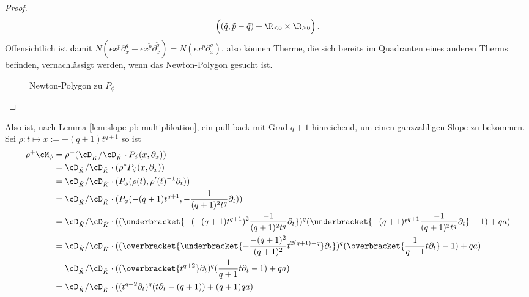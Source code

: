 \begin{proof}
\[\Big( (\tilde q,\tilde p-\tilde q) + \R_{\leq 0} \times \R_{\geq 0} \Big) \,.
\]
Offensichtlich ist damit $ N(\epsilon x^{p}\partial_x^{q}+\tilde\epsilon
x^{\tilde p}\partial_x^{\tilde q}) =N(\epsilon x^{p}\partial_x^{q}) $, also
können Therme, die sich bereits im Quadranten eines anderen Therms befinden,
vernachlässigt werden, wenn das Newton-Polygon gesucht ist.
\begin{figure}[htbp] %
\begin{center}
\end{center}
\caption{Newton-Polygon zu $P_{\phi}$}
\end{figure}
\end{proof}
Also ist, nach Lemma \ref{lem:slope-pb-multiplikation}, ein pull-back mit Grad
$q+1$ hinreichend, um einen ganzzahligen Slope zu bekommen.
Sei $\rho:t\mapsto x:=-(q+1) t^{q+1}$ so ist
\begin{align*}
\rho^+\cM_\phi &= \rho^+(\cD_{\hat K}/\cD_{\hat K}\cdot P_\phi(x,\partial_x))\\
  &=\cD_{\hat K}/\cD_{\hat K}\cdot(\rho^*P_\phi(x,\partial_x))\\
  &=\cD_{\hat K}/\cD_{\hat K}\cdot(P_\phi(\rho(t),\rho'(t)^{-1}\partial_t))\\
  &=\cD_{\hat K}/\cD_{\hat K}
    \cdot(P_\phi(-(q+1) t^{q+1},-\frac{1}{(q+1)^2t^q}\partial_t))\\
  &=\cD_{\hat K}/\cD_{\hat K} \cdot
    ((\underbracket{-(-(q+1) t^{q+1})^2\frac{-1}{(q+1)^2t^{q}}\partial_t})^{q}
    (\underbracket{-(q+1) t^{q+1}\frac{-1}{(q+1)^2t^{q}}\partial_t}-1)+qa)\\
  &=\cD_{\hat K}/\cD_{\hat K}
    \cdot((\overbracket{
      \underbracket{-\frac{-(q+1)^2}{(q+1)^2}t^{2(q+1)-q}}\partial_t})^{q}
    (\overbracket{\frac{1}{q+1}t\partial_t}-1)+qa)\\
  &=\cD_{\hat K}/\cD_{\hat K}
    \cdot((\overbracket{t^{q+2}}\partial_t)^{q}
    (\frac{1}{q+1}t\partial_t-1)+qa)\\
  &=\cD_{\hat K}/\cD_{\hat K}
    \cdot((t^{q+2}\partial_t)^{q}
    (t\partial_t-(q+1))+(q+1)qa)
\end{align*}
